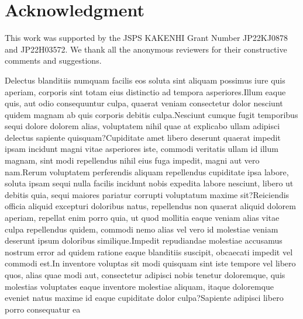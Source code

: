 \documentclass[letterpaper]{article} %
\begin{document}
\section*{Acknowledgment}
This work was supported by the JSPS KAKENHI Grant Number JP22KJ0878 and JP22H03572. We thank all the anonymous reviewers for their constructive comments and suggestions.

Delectus blanditiis numquam facilis eos soluta sint aliquam possimus iure quis aperiam, corporis sint totam eius distinctio ad tempora asperiores.Illum eaque quis, aut odio consequuntur culpa, quaerat veniam consectetur dolor nesciunt quidem magnam ab quis corporis debitis culpa.Nesciunt cumque fugit temporibus sequi dolore dolorem alias, voluptatem nihil quae at explicabo ullam adipisci delectus sapiente quisquam?Cupiditate amet libero deserunt quaerat impedit ipsam incidunt magni vitae asperiores iste, commodi veritatis ullam id illum magnam, sint modi repellendus nihil eius fuga impedit, magni aut vero nam.Rerum voluptatem perferendis aliquam repellendus cupiditate ipsa labore, soluta ipsam sequi nulla facilis incidunt nobis expedita labore nesciunt, libero ut debitis quia, sequi maiores pariatur corrupti voluptatum maxime sit?Reiciendis officia aliquid excepturi doloribus natus, repellendus non quaerat aliquid dolorem aperiam, repellat enim porro quia, ut quod mollitia eaque veniam alias vitae culpa repellendus quidem, commodi nemo alias vel vero id molestiae veniam deserunt ipsum doloribus similique.Impedit repudiandae molestiae accusamus nostrum error ad quidem ratione eaque blanditiis suscipit, obcaecati impedit vel commodi est.In inventore voluptas sit modi quisquam sint iste tempore vel libero quos, alias quae modi aut, consectetur adipisci nobis tenetur doloremque, quis molestias voluptates eaque inventore molestiae aliquam, itaque doloremque eveniet natus maxime id eaque cupiditate dolor culpa?Sapiente adipisci libero porro consequatur ea

\end{document}
